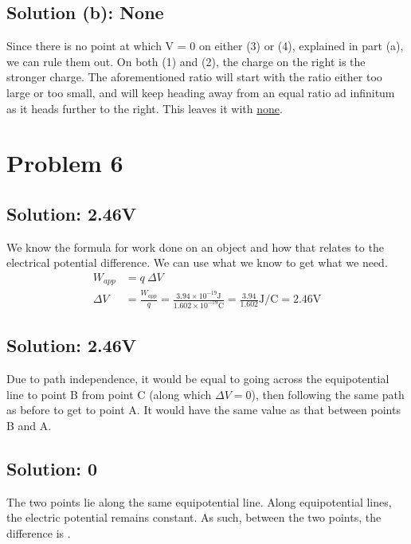 \documentclass[12pt]{article}
\begin{document}
\subsection{Solution (b): None}
Since there is no point at which V = 0 on either (3) or (4), explained in part (a), we can rule them out. 
On both (1) and (2), the charge on the right is the stronger charge.
The aforementioned ratio will start with the ratio either too large or too small, and will keep heading away from an equal ratio ad infinitum as it heads further to the right. 
This leaves it with \underline{none}.


\section{Problem 6}

\subsection{Solution: 2.46V}
We know the formula for work done on an object and how that relates to the electrical potential difference.
We can use what we know to get what we need.
\begin{align*}
    W_{app} &=  q\ \Delta V\\
    \Delta V    &=  \frac{W_{app}}{q}
        =   \frac{3.94 \times 10^{-19} \unit{\joule}}{1.602 \times 10^{-19} \unit{\coulomb}}
        =   \frac{3.94}{1.602} \unit{\joule/\coulomb}
        =   \boxed{2.46 \unit{\volt}}
\end{align*}

\subsection{Solution: 2.46V}
Due to path independence, it would be equal to going across the equipotential line to point B from point C (along which $\Delta V = 0$), then following the same path as before to get to point A.
It would have the same value as that between points B and A.

\subsection{Solution: 0}
The two points lie along the same equipotential line. 
Along equipotential lines, the electric potential remains constant.
As such, between the two points, the difference is .
\end{document}
